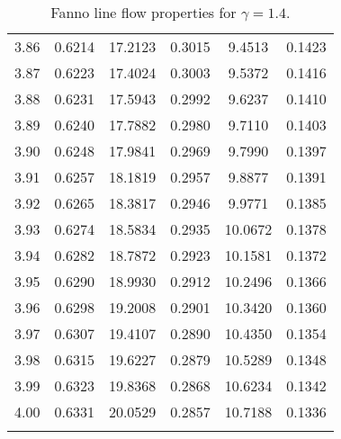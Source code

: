 \documentclass{article}
\begin{document}
\begin{longtable}{cccccc}
3.86 & 0.6214 & 17.2123 & 0.3015 & 9.4513 & 0.1423 \\
3.87 & 0.6223 & 17.4024 & 0.3003 & 9.5372 & 0.1416 \\
3.88 & 0.6231 & 17.5943 & 0.2992 & 9.6237 & 0.1410 \\
3.89 & 0.6240 & 17.7882 & 0.2980 & 9.7110 & 0.1403 \\
3.90 & 0.6248 & 17.9841 & 0.2969 & 9.7990 & 0.1397 \\
3.91 & 0.6257 & 18.1819 & 0.2957 & 9.8877 & 0.1391 \\
3.92 & 0.6265 & 18.3817 & 0.2946 & 9.9771 & 0.1385 \\
3.93 & 0.6274 & 18.5834 & 0.2935 & 10.0672 & 0.1378 \\
3.94 & 0.6282 & 18.7872 & 0.2923 & 10.1581 & 0.1372 \\
3.95 & 0.6290 & 18.9930 & 0.2912 & 10.2496 & 0.1366 \\
3.96 & 0.6298 & 19.2008 & 0.2901 & 10.3420 & 0.1360 \\
3.97 & 0.6307 & 19.4107 & 0.2890 & 10.4350 & 0.1354 \\
3.98 & 0.6315 & 19.6227 & 0.2879 & 10.5289 & 0.1348 \\
3.99 & 0.6323 & 19.8368 & 0.2868 & 10.6234 & 0.1342 \\
4.00 & 0.6331 & 20.0529 & 0.2857 & 10.7188 & 0.1336 \\
\bottomrule
\caption{Fanno line flow properties for $\gamma = 1.4$.}
\end{longtable}
\end{document}
